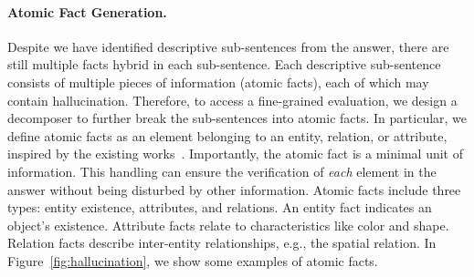 \paragraph{Atomic Fact Generation.} 
Despite we have identified descriptive sub-sentences from the answer, there are still multiple facts hybrid in each sub-sentence.
Each descriptive sub-sentence consists of multiple pieces of information (\ie atomic facts), each of which may contain hallucination. Therefore, to access a fine-grained evaluation, we design a decomposer to further break the sub-sentences into atomic facts. 
In particular, 
we define atomic facts as an element belonging to an entity, relation, or attribute, inspired by the existing works~\cite{factscore,TIFA}. 
Importantly, the atomic fact is a minimal unit of information. This handling can ensure the verification of \emph{each} element in the answer without being disturbed by other information. 
Atomic facts include three types: entity existence, attributes, and relations. An entity fact indicates an object’s existence. Attribute facts relate to characteristics like color and shape. Relation facts describe inter-entity relationships, e.g., the spatial relation. 
In Figure~\ref{fig:hallucination}, we show some examples of atomic facts. 

